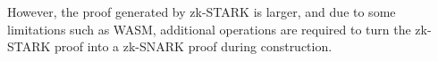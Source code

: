 However, the proof generated by zk-STARK is larger, and due to some limitations such as WASM, additional operations are required to turn the zk-STARK proof into a zk-SNARK proof during construction.
    






